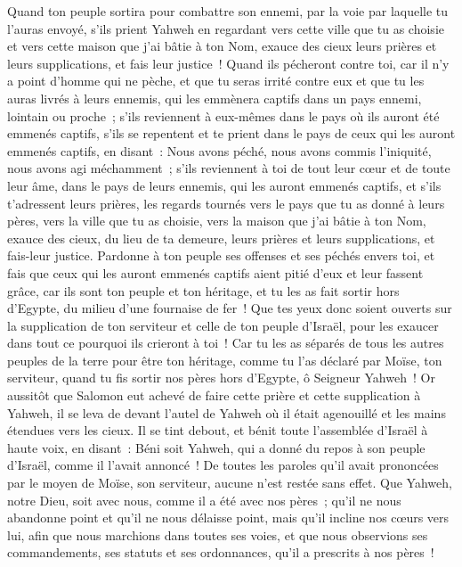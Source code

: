 \begin{multicols}{2}
Quand ton peuple sortira pour combattre son ennemi, par la voie par laquelle tu l'auras envoyé, s'ils prient Yahweh en regardant vers cette ville que tu as choisie et vers cette maison que j'ai bâtie à ton Nom,
exauce des cieux leurs prières et leurs supplications, et fais leur justice~!
Quand ils pécheront contre toi, car il n'y a point d'homme qui ne pèche, et que tu seras irrité contre eux et que tu les auras livrés à leurs ennemis, qui les emmènera captifs dans un pays ennemi, lointain ou proche~;
s'ils reviennent à eux-mêmes dans le pays où ils auront été emmenés captifs, s'ils se repentent et te prient dans le pays de ceux qui les auront emmenés captifs, en disant~: Nous avons péché, nous avons commis l'iniquité, nous avons agi méchamment~;
s'ils reviennent à toi de tout leur cœur et de toute leur âme, dans le pays de leurs ennemis, qui les auront emmenés captifs, et s'ils t'adressent leurs prières, les regards tournés vers le pays que tu as donné à leurs pères, vers la ville que tu as choisie, vers la maison que j'ai bâtie à ton Nom,
exauce des cieux, du lieu de ta demeure, leurs prières et leurs supplications, et fais-leur justice.
Pardonne à ton peuple ses offenses et ses péchés envers toi, et fais que ceux qui les auront emmenés captifs aient pitié d'eux et leur fassent grâce,
car ils sont ton peuple et ton héritage, et tu les as fait sortir hors d'Egypte, du milieu d'une fournaise de fer~!
Que tes yeux donc soient ouverts sur la supplication de ton serviteur et celle de ton peuple d'Israël, pour les exaucer dans tout ce pourquoi ils crieront à toi~!
Car tu les as séparés de tous les autres peuples de la terre pour être ton héritage, comme tu l'as déclaré par Moïse, ton serviteur, quand tu fis sortir nos pères hors d'Egypte, ô Seigneur Yahweh~!
Or aussitôt que Salomon eut achevé de faire cette prière et cette supplication à Yahweh, il se leva de devant l'autel de Yahweh où il était agenouillé et les mains étendues vers les cieux.
Il se tint debout, et bénit toute l'assemblée d'Israël à haute voix, en disant~:
Béni soit Yahweh, qui a donné du repos à son peuple d'Israël, comme il l'avait annoncé~! De toutes les paroles qu'il avait prononcées par le moyen de Moïse, son serviteur, aucune n'est restée sans effet.
Que Yahweh, notre Dieu, soit avec nous, comme il a été avec nos pères~; qu'il ne nous abandonne point et qu'il ne nous délaisse point,
mais qu'il incline nos cœurs vers lui, afin que nous marchions dans toutes ses voies, et que nous observions ses commandements, ses statuts et ses ordonnances, qu'il a prescrits à nos pères~!

\end{multicols}
